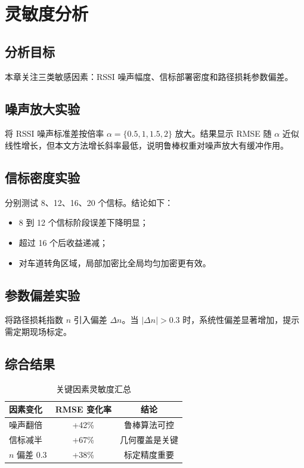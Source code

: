 \chapter{灵敏度分析}

\section{分析目标}
本章关注三类敏感因素：RSSI 噪声幅度、信标部署密度和路径损耗参数偏差。

\section{噪声放大实验}
将 RSSI 噪声标准差按倍率 $\alpha=\{0.5,1,1.5,2\}$ 放大。结果显示 RMSE 随 $\alpha$ 近似线性增长，但本文方法增长斜率最低，说明鲁棒权重对噪声放大有缓冲作用。

\section{信标密度实验}
分别测试 8、12、16、20 个信标。结论如下：
\begin{itemize}
  \item 8 到 12 个信标阶段误差下降明显；
  \item 超过 16 个后收益递减；
  \item 对车道转角区域，局部加密比全局均匀加密更有效。
\end{itemize}

\section{参数偏差实验}
将路径损耗指数 $n$ 引入偏差 $\Delta n$。当 $|\Delta n|>0.3$ 时，系统性偏差显著增加，提示需定期现场标定。

\section{综合结果}
\begin{table}[H]
\centering
\caption{关键因素灵敏度汇总}
\begin{tabular}{lcc}
\toprule
因素变化 & RMSE 变化率 & 结论 \\
\midrule
噪声翻倍 & +42\% & 鲁棒算法可控 \\
信标减半 & +67\% & 几何覆盖是关键 \\
$n$ 偏差 0.3 & +38\% & 标定精度重要 \\
\bottomrule
\end{tabular}
\end{table}
